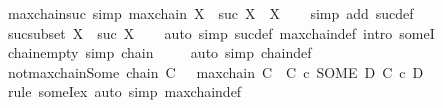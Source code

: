 \begin{isabellebody}
\endisatagproof
{\isafoldproof}%
%
\isadelimproof
\isanewline
%
\endisadelimproof
\isanewline
{}\isamarkupfalse%
\ maxchain{\isacharunderscore}{\kern0pt}suc\ {\isacharbrackleft}{\kern0pt}simp{\isacharbrackright}{\kern0pt}{\isacharcolon}{\kern0pt}\ {\isachardoublequoteopen}maxchain\ X\ {\isasymLongrightarrow}\ suc\ X\ {\isacharequal}{\kern0pt}\ X{\isachardoublequoteclose}\isanewline
%
\isadelimproof
\ \ %
\endisadelimproof
%
\isatagproof
{}\isamarkupfalse%
\ {\isacharparenleft}{\kern0pt}simp\ add{\isacharcolon}{\kern0pt}\ suc{\isacharunderscore}{\kern0pt}def{\isacharparenright}{\kern0pt}%
\endisatagproof
{\isafoldproof}%
%
\isadelimproof
\isanewline
%
\endisadelimproof
\isanewline
{}\isamarkupfalse%
\ suc{\isacharunderscore}{\kern0pt}subset{\isacharcolon}{\kern0pt}\ {\isachardoublequoteopen}X\ {\isasymsubseteq}\ suc\ X{\isachardoublequoteclose}\isanewline
%
\isadelimproof
\ \ %
\endisadelimproof
%
\isatagproof
{}\isamarkupfalse%
\ {\isacharparenleft}{\kern0pt}auto\ simp{\isacharcolon}{\kern0pt}\ suc{\isacharunderscore}{\kern0pt}def\ maxchain{\isacharunderscore}{\kern0pt}def\ intro{\isacharcolon}{\kern0pt}\ someI{}{\isacharparenright}{\kern0pt}%
\endisatagproof
{\isafoldproof}%
%
\isadelimproof
\isanewline
%
\endisadelimproof
\isanewline
{}\isamarkupfalse%
\ chain{\isacharunderscore}{\kern0pt}empty\ {\isacharbrackleft}{\kern0pt}simp{\isacharbrackright}{\kern0pt}{\isacharcolon}{\kern0pt}\ {\isachardoublequoteopen}chain\ {\isacharbraceleft}{\kern0pt}{\isacharbraceright}{\kern0pt}{\isachardoublequoteclose}\isanewline
%
\isadelimproof
\ \ %
\endisadelimproof
%
\isatagproof
{}\isamarkupfalse%
\ {\isacharparenleft}{\kern0pt}auto\ simp{\isacharcolon}{\kern0pt}\ chain{\isacharunderscore}{\kern0pt}def{\isacharparenright}{\kern0pt}%
\endisatagproof
{\isafoldproof}%
%
\isadelimproof
\isanewline
%
\endisadelimproof
\isanewline
{}\isamarkupfalse%
\ not{\isacharunderscore}{\kern0pt}maxchain{\isacharunderscore}{\kern0pt}Some{\isacharcolon}{\kern0pt}\ {\isachardoublequoteopen}chain\ C\ {\isasymLongrightarrow}\ {\isasymnot}\ maxchain\ C\ {\isasymLongrightarrow}\ C\ {\isacharless}{\kern0pt}c\ {\isacharparenleft}{\kern0pt}SOME\ D{\isachardot}{\kern0pt}\ C\ {\isacharless}{\kern0pt}c\ D{\isacharparenright}{\kern0pt}{\isachardoublequoteclose}\isanewline
%
\isadelimproof
\ \ %
\endisadelimproof
%
\isatagproof
{}\isamarkupfalse%
\ {\isacharparenleft}{\kern0pt}rule\ someI{\isacharunderscore}{\kern0pt}ex{\isacharparenright}{\kern0pt}\ {\isacharparenleft}{\kern0pt}auto\ simp{\isacharcolon}{\kern0pt}\ maxchain{\isacharunderscore}{\kern0pt}def{\isacharparenright}{\kern0pt}%

\end{isabellebody}
